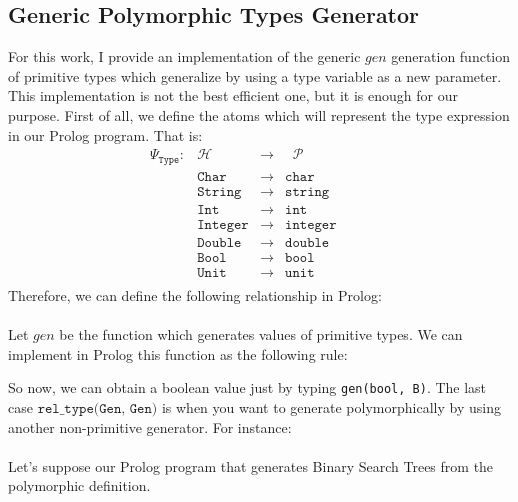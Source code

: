 \documentclass{report}
\theoremstyle{definition}
\theoremstyle{definition}
\newcommand{\ttt}[1]{\texttt{#1}}
\newcommand{\tav}{\;\;}
\begin{document}
	\subsection{Generic Polymorphic Types Generator}
	For this work, I provide an implementation of the generic $gen$ generation function of primitive types which generalize by using a type variable as a new parameter. This implementation is not the best efficient one, but it is enough for our purpose. First of all, we define the atoms which will represent the type expression in our Prolog program. That is:
	\begin{equation*}
		\begin{matrix}
			\Psi_{\ttt{Type}}: & \mathcal{H}   & \longrightarrow & \tav \mathcal{P} &   &   &   \\
			                   & \ttt{Char}    & \longrightarrow & \ttt{char}       &   &   &   \\
			                   & \ttt{String}  & \longrightarrow & \ttt{string}     &   &   &   \\
			                   & \ttt{Int}     & \longrightarrow & \ttt{int}        &   &   &   \\
			                   & \ttt{Integer} & \longrightarrow & \ttt{integer}    &   &   &   \\
			                   & \ttt{Double}  & \longrightarrow & \ttt{double}     &   &   &   \\
			                   & \ttt{Bool}    & \longrightarrow & \ttt{bool}       &   &   &   \\
			                   & \ttt{Unit}    & \longrightarrow & \ttt{unit}       &   &   &   \\
		\end{matrix}
	\end{equation*}
	Therefore, we can define the following relationship in Prolog:\\\\
	Let $gen$ be the function which generates values of primitive types. We can implement in Prolog this function as the following rule:
	
	So now, we can obtain a boolean value just by typing \ttt{gen(bool, B)}. The last case $\ttt{rel\_type(Gen, Gen)}$ is when you want to generate polymorphically by using another non-primitive generator. For instance:\\\\
	Let's suppose our Prolog program that generates Binary Search Trees from the polymorphic definition.
\end{document}
